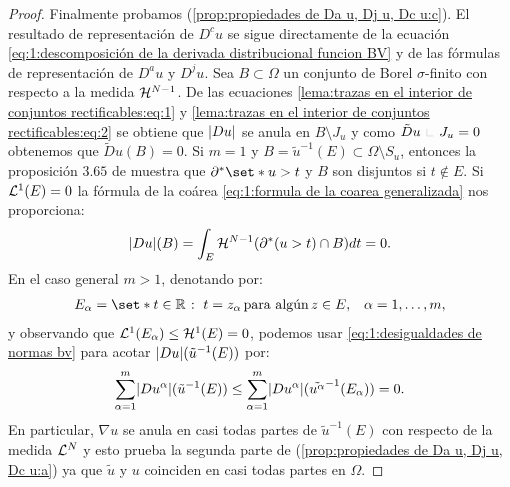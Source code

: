 \documentclass[a4paper,11pt,spanish, twoside, leqno]{tfm-uam}
\begin{document}
\begin{proof}
Finalmente probamos (\ref{prop:propiedades de Da u, Dj u, Dc u:c}). El resultado de representación de $D^{c}u$ se sigue directamente de la ecuación \ref{eq:1:descomposición de la derivada distribucional funcion BV} y de las fórmulas de representación de $D^{a}u$ y $D^{j}u$. Sea $B\subset \Omega$ un conjunto de Borel $\sigma$-finito con respecto a la medida $\mathcal{H}^{N-1}$. De las ecuaciones \ref{lema:trazas en el interior de conjuntos rectificables:eq:1} y \ref{lema:trazas en el interior de conjuntos rectificables:eq:2} se obtiene que $\lvert Du\rvert$ se anula en $B\setminus J_{u}$ y como $\tilde{D}u\Radot J_{u}=0$ obtenemos que $\tilde{D}u(B)=0$. Si $m=1$ y $B=\tilde{u}^{-1}(E)\subset \Omega\setminus S_{u}$, entonces la proposición $3.65$ de \cite{ambrosio2000functions} muestra que $\partial^{*}\set*{u>t}$ y $B$ son disjuntos si $t\not \in E$. Si $\mathcal{L}^{1}(E)=0$ la fórmula de la coárea \ref{eq:1:formula de la coarea generalizada} nos proporciona:
\begin{align*}
\lvert Du\rvert(B)=\int_{E}\mathcal{H}^{N-1}(\partial^{*}(u>t)\cap B) dt=0.
\end{align*}
En el caso general $m>1$, denotando por:
\begin{align*}
\begin{array}{ll}
E_{\alpha}=\set*{t\in \R \given t=z_{\alpha}\, \text{para algún}\, z\in E}, & \alpha=1,\ldots,m,
\end{array}
\end{align*}
y observando que $\mathcal{L}^{1}(E_{\alpha})\leq \mathcal{H}^{1}(E)=0$, podemos usar \ref{eq:1:desigualdades de normas bv} para acotar $\lvert Du\rvert(\tilde{u}^{-1}(E))$ por:
\begin{align*}
\sum^{m}_{\alpha=1}\lvert Du^{\alpha}\rvert(\tilde{u}^{-1}(E))\leq \sum^{m}_{\alpha=1}\lvert Du^{\alpha}\rvert(\tilde{u^{\alpha}}^{-1}(E_{\alpha}))=0.
\end{align*}
En particular, $\nabla{u}$ se anula en casi todas partes de $\tilde{u}^{-1}(E)$ con respecto de la medida $\mathcal{L}^{N}$ y esto prueba la segunda parte de (\ref{prop:propiedades de Da u, Dj u, Dc u:a}) ya que $\tilde{u}$ y $u$ coinciden en casi todas partes en $\Omega$.
\end{proof}
\end{document}
